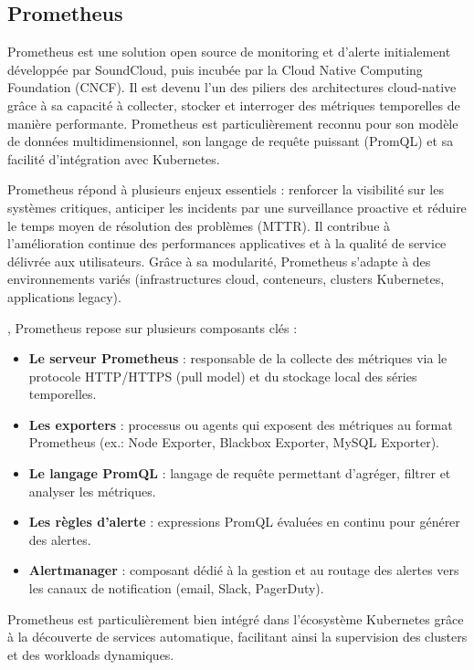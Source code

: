 \subsection{Prometheus}

Prometheus est une solution open source de monitoring et d’alerte initialement développée par SoundCloud, puis incubée par la Cloud Native Computing Foundation (CNCF). Il est devenu l’un des piliers des architectures cloud-native grâce à sa capacité à collecter, stocker et interroger des métriques temporelles de manière performante. Prometheus est particulièrement reconnu pour son modèle de données multidimensionnel, son langage de requête puissant (PromQL) et sa facilité d’intégration avec Kubernetes.

 Prometheus répond à plusieurs enjeux essentiels  : renforcer la visibilité sur les systèmes critiques, anticiper les incidents par une surveillance proactive et réduire le temps moyen de résolution des problèmes (MTTR). Il contribue à l’amélioration continue des performances applicatives et à la qualité de service délivrée aux utilisateurs. Grâce à sa modularité, Prometheus s’adapte à des environnements variés (infrastructures cloud, conteneurs, clusters Kubernetes, applications legacy).

, Prometheus repose sur plusieurs composants clés  :
\begin{itemize}
	\item \textbf{Le serveur Prometheus}  : responsable de la collecte des métriques via le protocole HTTP/HTTPS (pull model) et du stockage local des séries temporelles.
	\item \textbf{Les exporters}  : processus ou agents qui exposent des métriques au format Prometheus (ex.: Node Exporter, Blackbox Exporter, MySQL Exporter).
	\item \textbf{Le langage PromQL}  : langage de requête permettant d’agréger, filtrer et analyser les métriques.
	\item \textbf{Les règles d’alerte}  : expressions PromQL évaluées en continu pour générer des alertes.
	\item \textbf{Alertmanager}  : composant dédié à la gestion et au routage des alertes vers les canaux de notification (email, Slack, PagerDuty).
\end{itemize}

Prometheus est particulièrement bien intégré dans l’écosystème Kubernetes grâce à la découverte de services automatique, facilitant ainsi la supervision des clusters et des workloads dynamiques.

